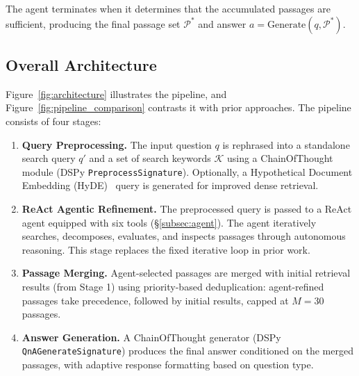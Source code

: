 The agent terminates when it determines that the accumulated passages are sufficient, producing the final passage set $\mathcal{P}^*$ and answer $a = \text{Generate}(q, \mathcal{P}^*)$.

\subsection{Overall Architecture}
\label{subsec:architecture}





Figure~\ref{fig:architecture} illustrates the \ours{} pipeline, and Figure~\ref{fig:pipeline_comparison} contrasts it with prior approaches. The pipeline consists of four stages:

\begin{enumerate}
    \item \textbf{Query Preprocessing.} The input question $q$ is rephrased into a standalone search query $q'$ and a set of search keywords $\mathcal{K}$ using a ChainOfThought module (DSPy \texttt{PreprocessSignature}). Optionally, a Hypothetical Document Embedding (HyDE)~\cite{gao2023hyde} query is generated for improved dense retrieval.

    \item \textbf{ReAct Agentic Refinement.} The preprocessed query is passed to a ReAct agent equipped with six tools (\S\ref{subsec:agent}). The agent iteratively searches, decomposes, evaluates, and inspects passages through autonomous reasoning. This stage replaces the fixed iterative loop in prior work.

    \item \textbf{Passage Merging.} Agent-selected passages are merged with initial retrieval results (from Stage 1) using priority-based deduplication: agent-refined passages take precedence, followed by initial results, capped at $M = 30$ passages.

    \item \textbf{Answer Generation.} A ChainOfThought generator (DSPy \texttt{QnAGenerate\-Signature}) produces the final answer conditioned on the merged passages, with adaptive response formatting based on question type.
\end{enumerate}

